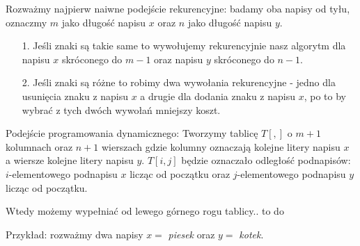 Rozważmy najpierw naiwne podejście rekurencyjne: badamy 
oba napisy od tyłu, oznaczmy $m$ jako długość napisu $x$
oraz $n$ jako długość napisu $y$. 
\begin{itemize}
	\item[1.] Jeśli znaki są takie same to wywołujemy rekurencyjnie
	nasz algorytm dla napisu $x$ skróconego do $m - 1$ oraz 
	napisu $y$ skróconego do $n - 1$.
	\item[2.] Jeśli znaki są różne to robimy dwa wywołania 
	rekurencyjne - jedno dla usunięcia znaku z napisu $x$ 
	a drugie dla dodania znaku z napisu $x$, po 
	to by wybrać z tych dwóch wywołań mniejszy koszt.
\end{itemize}


Podejście programowania dynamicznego: Tworzymy tablicę $T[,]$ o
$m + 1$ kolumnach oraz $n + 1$ wierszach
gdzie kolumny oznaczają kolejne litery napisu $x$ a
wiersze kolejne litery napisu $y$. 
$T[i, j]$ będzie oznaczało odległość podnapisów:
$i$-elementowego podnapisu $x$ licząc od początku oraz 
$j$-elementowego podnapisu $y$ licząc od początku.

Wtedy możemy wypełniać od lewego górnego rogu tablicy.. to do


Przykład: rozważmy dwa napisy $x =$ \textit{piesek} oraz $y =$ \textit{kotek}.


